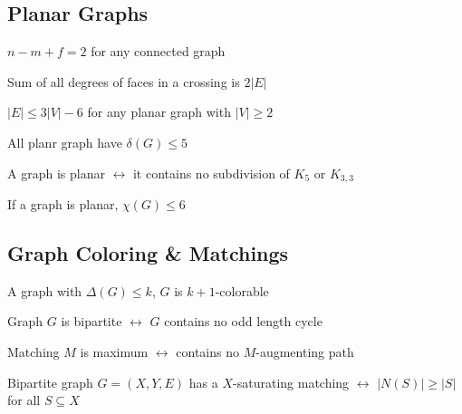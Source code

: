 \subsection*{Planar Graphs}

\begin{theorem}
	$n-m+f=2$ for any connected graph
\end{theorem}

\begin{theorem}
	Sum of all degrees of faces in a crossing is $2|E|$
\end{theorem}

\begin{corollary}
	$|E|\leq 3|V|-6$ for any planar graph with $|V|\geq 2$
\end{corollary}

\begin{theorem}
	All planr graph have $\delta(G)\leq 5$
\end{theorem}

\begin{theorem}
	A graph is planar $\leftrightarrow$ it contains no subdivision of $K_5$ or $K_{3,3}$
\end{theorem}

\begin{theorem}
	If a graph is planar, $\chi(G)\leq 6$
\end{theorem}

\subsection*{Graph Coloring \& Matchings}

\begin{theorem}
	A graph with $\Delta(G)\leq k$, $G$ is $k+1$-colorable
\end{theorem}

\begin{theorem}
	Graph $G$ is bipartite $\leftrightarrow$ $G$ contains no odd length cycle
\end{theorem}

\begin{theorem}
	Matching $M$ is maximum $\leftrightarrow$ contains no $M$-augmenting path
\end{theorem}

\begin{theorem}
	Bipartite graph $G=(X,Y,E)$ has a $X$-saturating matching $\leftrightarrow$ $|N(S)| \geq |S|$ for all $S\subseteq X$
\end{theorem}


